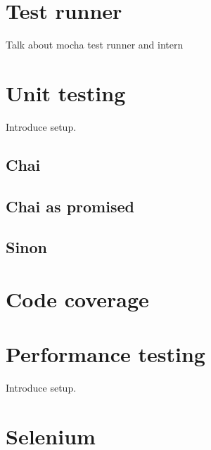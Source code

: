 \section{Test runner} {
	
	Talk about mocha test runner and intern



}

\section{Unit testing} {

	Introduce setup.

	\subsection{Chai} {

	}

	\subsection{Chai as promised} {
	
	}

	\subsection{Sinon} {

	}

}

\section{Code coverage} {
	

}

\section{Performance testing} {

	Introduce setup.
	
	\section{Selenium} {

	}

}
